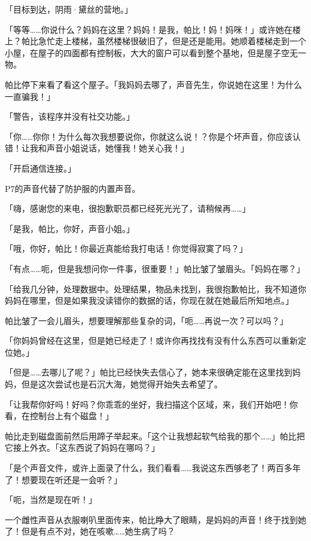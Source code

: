 「目标到达，阴雨·黛丝的营地。」

「等等……你说什么？妈妈在这里？妈妈！是我，帕比！妈！妈咪！」或许她在楼上？帕比急忙走上楼梯，虽然楼梯很破旧了，但是还是能用。她顺着楼梯走到一个小屋，在屋子的四面都有控制板，大大的窗户可以看到整个基地，但是屋子空无一物。

帕比停下来看了看这个屋子。「我妈妈去哪了，声音先生，你说她在这里！为什么一直骗我！」

「{\mt 警告，该程序并没有社交功能。}」

「你……你你！为什么每次我想要说你，你就这么说！？你是个坏声音，你应该认错！让我和声音小姐说话，她懂我！她关心我！」

「{\mt 开启通信连接。}」

P7的声音代替了防护服的内置声音。

「嗨，感谢您的来电，很抱歉职员都已经死光光了，请稍候再……」

「是我，帕比，你好，声音小姐。」

「哦，你好，帕比！你最近真能给我打电话！你觉得寂寞了吗？」

「有点……呃，但是我想问你一件事，很重要！」帕比皱了皱眉头。「妈妈在哪？」

「给我几分钟，处理数据中。处理结果，物品未找到，我很抱歉帕比，我不知道你妈妈在哪里，但是如果我没读错你的数据的话，你现在就在她最后所知地点。」

帕比皱了一会儿眉头，想要理解那些复杂的词，「呃……再说一次？可以吗？」

「你妈妈曾经在这里，但是她已经走了！或许你再找找有没有什么东西可以重新定位她。」

「但是……去哪儿了呢？」帕比已经快失去信心了，她本来很确定能在这里找到妈妈，但是这次尝试也是石沉大海，她觉得开始失去希望了。

「让我帮你好吗！好吗？你乖乖的坐好，我扫描这个区域，来，我们开始吧！你看，在控制台上有个磁盘！」

帕比走到磁盘面前然后用蹄子举起来。「这个让我想起软气给我的那个……」帕比把它接上外衣。「这东西说了妈妈在哪吗？」

「是个声音文件，或许上面录了什么，我们看看……我说这东西够老了！两百多年了！想要现在听还是一会听？」

「呃，当然是现在听！」

一个雌性声音从衣服喇叭里面传来，帕比睁大了眼睛，是妈妈的声音！终于找到她了！但是有点不对，她在咳嗽……她生病了吗？


